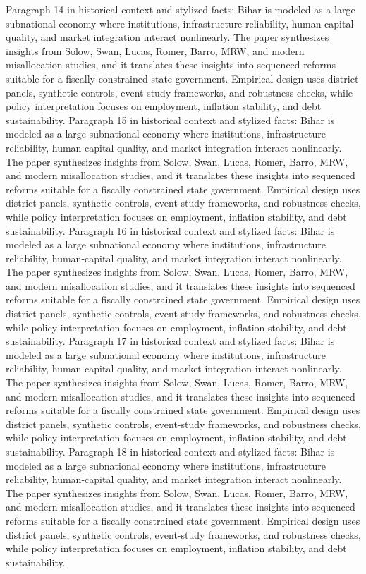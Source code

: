 \documentclass[preprint,12pt]{elsarticle}
\begin{document}
Paragraph 14 in historical context and stylized facts: Bihar is modeled as a large subnational economy where institutions, infrastructure reliability, human-capital quality, and market integration interact nonlinearly. The paper synthesizes insights from Solow, Swan, Lucas, Romer, Barro, MRW, and modern misallocation studies, and it translates these insights into sequenced reforms suitable for a fiscally constrained state government. Empirical design uses district panels, synthetic controls, event-study frameworks, and robustness checks, while policy interpretation focuses on employment, inflation stability, and debt sustainability.
Paragraph 15 in historical context and stylized facts: Bihar is modeled as a large subnational economy where institutions, infrastructure reliability, human-capital quality, and market integration interact nonlinearly. The paper synthesizes insights from Solow, Swan, Lucas, Romer, Barro, MRW, and modern misallocation studies, and it translates these insights into sequenced reforms suitable for a fiscally constrained state government. Empirical design uses district panels, synthetic controls, event-study frameworks, and robustness checks, while policy interpretation focuses on employment, inflation stability, and debt sustainability.
Paragraph 16 in historical context and stylized facts: Bihar is modeled as a large subnational economy where institutions, infrastructure reliability, human-capital quality, and market integration interact nonlinearly. The paper synthesizes insights from Solow, Swan, Lucas, Romer, Barro, MRW, and modern misallocation studies, and it translates these insights into sequenced reforms suitable for a fiscally constrained state government. Empirical design uses district panels, synthetic controls, event-study frameworks, and robustness checks, while policy interpretation focuses on employment, inflation stability, and debt sustainability.
Paragraph 17 in historical context and stylized facts: Bihar is modeled as a large subnational economy where institutions, infrastructure reliability, human-capital quality, and market integration interact nonlinearly. The paper synthesizes insights from Solow, Swan, Lucas, Romer, Barro, MRW, and modern misallocation studies, and it translates these insights into sequenced reforms suitable for a fiscally constrained state government. Empirical design uses district panels, synthetic controls, event-study frameworks, and robustness checks, while policy interpretation focuses on employment, inflation stability, and debt sustainability.
Paragraph 18 in historical context and stylized facts: Bihar is modeled as a large subnational economy where institutions, infrastructure reliability, human-capital quality, and market integration interact nonlinearly. The paper synthesizes insights from Solow, Swan, Lucas, Romer, Barro, MRW, and modern misallocation studies, and it translates these insights into sequenced reforms suitable for a fiscally constrained state government. Empirical design uses district panels, synthetic controls, event-study frameworks, and robustness checks, while policy interpretation focuses on employment, inflation stability, and debt sustainability.
\end{document}
